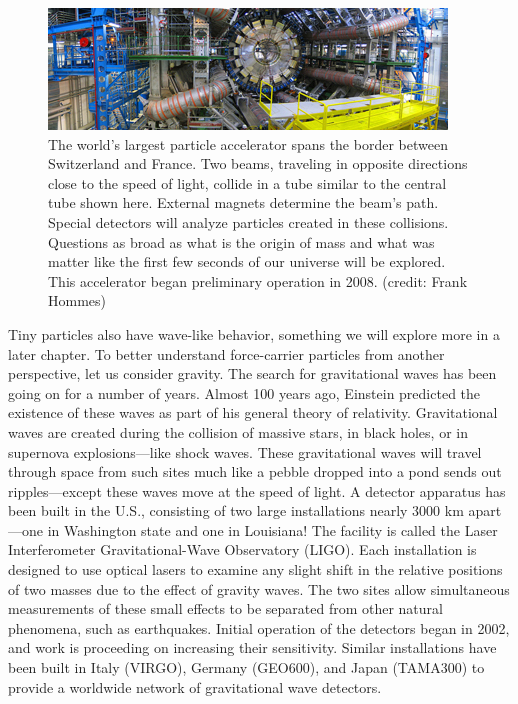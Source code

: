 \documentclass[
]{book}
\begin{document}
\begin{figure}
\hypertarget{import-auto-id2658974}{%
\centering
\includegraphics{images/Figure_04_08_03.jpg}
\caption{The world's largest particle accelerator spans the border between
Switzerland and France. Two beams, traveling in opposite directions
close to the speed of light, collide in a tube similar to the central
tube shown here. External magnets determine the beam's path. Special
detectors will analyze particles created in these collisions. Questions
as broad as what is the origin of mass and what was matter like the
first few seconds of our universe will be explored. This accelerator
began preliminary operation in 2008. (credit: Frank
Hommes)}\label{import-auto-id2658974}
}
\end{figure}

Tiny particles also have wave-like behavior, something we will explore
more in a later chapter. To better understand force-carrier particles
from another perspective, let us consider gravity. The search for
gravitational waves has been going on for a number of years. Almost 100
years ago, Einstein predicted the existence of these waves as part of
his general theory of relativity. Gravitational waves are created during
the collision of massive stars, in black holes, or in supernova
explosions---like shock waves. These gravitational waves will travel
through space from such sites much like a pebble dropped into a pond
sends out ripples---except these waves move at the speed of light. A
detector apparatus has been built in the U.S., consisting of two large
installations nearly 3000 km apart---one in Washington state and one in
Louisiana! The facility is called the Laser Interferometer
Gravitational-Wave Observatory (LIGO). Each installation is designed to
use optical lasers to examine any slight shift in the relative positions
of two masses due to the effect of gravity waves. The two sites allow
simultaneous measurements of these small effects to be separated from
other natural phenomena, such as earthquakes. Initial operation of the
detectors began in 2002, and work is proceeding on increasing their
sensitivity. Similar installations have been built in Italy (VIRGO),
Germany (GEO600), and Japan (TAMA300) to provide a worldwide network of
gravitational wave detectors.
\end{document}
